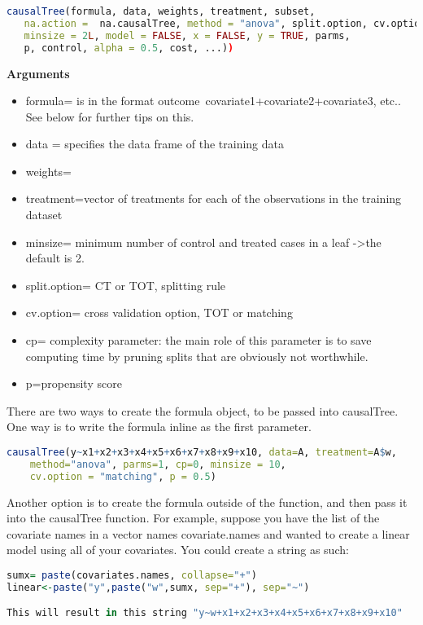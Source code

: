 \documentclass{article}
\begin{document}
\begin{lstlisting}[language=R]
causalTree(formula, data, weights, treatment, subset, 
   na.action =  na.causalTree, method = "anova", split.option, cv.option, 
   minsize = 2L, model = FALSE, x = FALSE, y = TRUE, parms, 
   p, control, alpha = 0.5, cost, ...))	                                            	                           
\end{lstlisting}
\textbf{Arguments} \\
\begin{itemize}
 \item formula= is in the format 
		outcome~covariate1+covariate2+covariate3, etc.. See below for further tips on this. 
  \item data = specifies the data frame of the training data
  \item weights=
  \item treatment=vector of treatments for each of the observations in the training dataset
  \item minsize= minimum number of control and treated cases in a leaf ->the default is 2.
  \item split.option= CT or TOT, splitting rule
  \item cv.option= cross validation option, TOT or matching
  \item cp= complexity parameter: the main role of this parameter is to save computing time by pruning splits that are obviously not worthwhile. 
  \item p=propensity score
 \end{itemize}
There are two ways to create the formula object, to be passed into causalTree. One way is to write the formula inline as the first parameter. \\

\begin{lstlisting}[language=R]
causalTree(y~x1+x2+x3+x4+x5+x6+x7+x8+x9+x10, data=A, treatment=A$w, 
	method="anova", parms=1, cp=0, minsize = 10, 
	cv.option = "matching", p = 0.5)
\end{lstlisting}

Another option is to create the formula outside of the function, and then pass it into the causalTree function. For example, suppose you have the list of the covariate names in a vector names covariate.names and wanted to create a linear model using all of your covariates. You could create a string as such: 
\begin{lstlisting}[language=R]
sumx= paste(covariates.names, collapse="+") 
linear<-paste("y",paste("w",sumx, sep="+"), sep="~") 

This will result in this string "y~w+x1+x2+x3+x4+x5+x6+x7+x8+x9+x10" 
\end{lstlisting}
\end{document}
